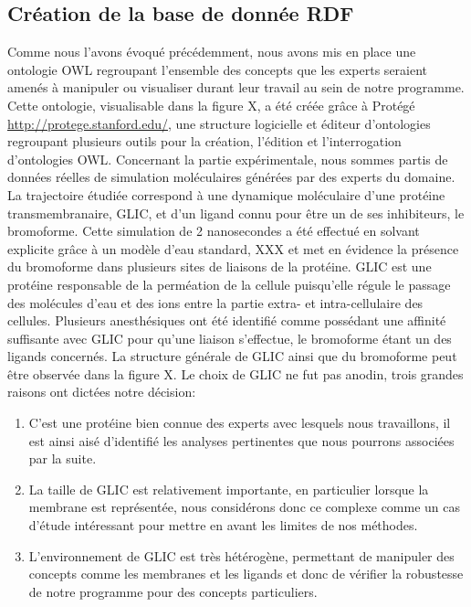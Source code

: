\subsection{Création de la base de donnée RDF}

Comme nous l'avons évoqué précédemment, nous avons mis en place une ontologie OWL regroupant l'ensemble des concepts que les experts seraient amenés à manipuler ou visualiser durant leur travail au sein de notre programme. Cette ontologie, visualisable dans la figure X, a été créée grâce à Protégé \url{http://protege.stanford.edu/}, une structure logicielle et éditeur d'ontologies regroupant plusieurs outils pour la création, l'édition et l'interrogation d'ontologies OWL.
Concernant la partie expérimentale, nous sommes partis de données réelles de simulation moléculaires générées par des experts du domaine. La trajectoire étudiée correspond à une dynamique moléculaire d'une protéine transmembranaire, GLIC, et d'un ligand connu pour être un de ses inhibiteurs, le bromoforme. Cette simulation de 2 nanosecondes a été effectué en solvant explicite grâce à un modèle d'eau standard, XXX et met en évidence la présence du bromoforme dans plusieurs sites de liaisons de la protéine. GLIC est une protéine responsable de la perméation de la cellule puisqu'elle régule le passage des molécules d'eau et des ions entre la partie extra- et intra-cellulaire des cellules. Plusieurs anesthésiques ont été identifié comme possédant une affinité suffisante avec GLIC pour qu'une liaison s'effectue, le bromoforme étant un des ligands concernés. La structure générale de GLIC ainsi que du bromoforme peut être observée dans la figure X. Le choix de GLIC ne fut pas anodin, trois grandes raisons ont dictées notre décision:
\begin{enumerate}
	\item C'est une protéine bien connue des experts avec lesquels nous travaillons, il est ainsi aisé d'identifié les analyses pertinentes que nous pourrons associées par la suite.
	\item La taille de GLIC est relativement importante, en particulier lorsque la membrane est représentée, nous considérons donc ce complexe comme un cas d'étude intéressant pour mettre en avant les limites de nos méthodes.
	\item L'environnement de GLIC est très hétérogène, permettant de manipuler des concepts comme les membranes et les ligands et donc de vérifier la robustesse de notre programme pour des concepts particuliers.
\end{enumerate}

